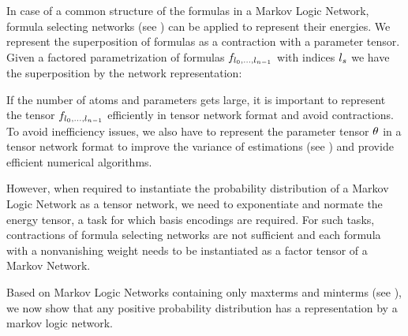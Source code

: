 In case of a common structure of the formulas in a Markov Logic Network, formula selecting networks (see ) can be applied to represent their energies.
We represent the superposition of formulas as a contraction with a parameter tensor.
Given a factored parametrization of formulas $f_{l_{0},\ldots,l_{n-1}}$ with indices $l_{s}$ we have the superposition by the network representation:
\begin{center}
    
\end{center}


If the number of atoms and parameters gets large, it is important to represent the tensor ${f_{l_{0},\ldots,l_{n-1}}}$ efficiently in tensor network format and avoid contractions.
To avoid inefficiency issues, we also have to represent the parameter tensor $\theta$ in a tensor network format to improve the variance of estimations (see ) and provide efficient numerical algorithms.

However, when required to instantiate the probability distribution of a Markov Logic Network as a tensor network, we need to exponentiate and normate the energy tensor, a task for which basis encodings are required.
For such tasks, contractions of formula selecting networks are not sufficient and each formula with a nonvanishing weight needs to be instantiated as a factor tensor of a Markov Network.






\label{sec:MLNMaxMintermRep}

Based on Markov Logic Networks containing only maxterms and minterms (see ), we now show that any positive probability distribution has a representation by a markov logic network.

